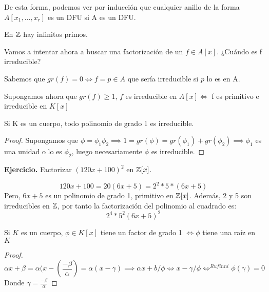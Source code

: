 \begin{nota}
	De esta forma, podemos ver por inducción que cualquier anillo de la forma $A[x_1,...,x_r] $ es un DFU si A es un DFU.
\end{nota}
\begin{nota}[2]
	En $\mathbb{Z}$ hay infinitos primos.

\end{nota}

Vamos a intentar ahora a buscar una factorización de un $f \in A[x]$. ¿Cuándo es f irreducible?

 Sabemos que $gr(f) = 0 \iff f = p \in A$ que sería irreducible si $p$ lo es en A.

 Supongamos ahora que $gr(f) \geq 1$, $f$ es irreducible en $A[x] \iff$ f es primitivo e irreducible en $K[x]$

\begin{nota}
	Si K es un cuerpo, todo polinomio de grado 1 es irreducible.
	\begin{proof}
	Supongamos que $\phi = \phi_1 \phi_2 \implies 1 = gr(\phi) =  gr(\phi_1)+gr(\phi_2) \implies \phi_1$ es una unidad o lo es $\phi_2$, luego necesariamente $\phi$ es irreducible.
\end{proof}
\end{nota}


\textbf{Ejercicio.} Factorizar $(120x+100)^2$ en $\mathbb{Z}[x]$.

\[
120x+100 = 20(6x+5) = 2^2*5*(6x+5)
\]
Pero, $6x+5$ es un polinomio de grado 1, primitivo en $\mathbb{Z}[x]$. Además, 2 y 5 son irreducibles en $\mathbb{Z}$, por tanto la factorización del polinomio al cuadrado es:
\[
2^4*5^2(6x+5)^2
\]

\begin{nota}
	Si $K$ es un cuerpo, $\phi \in K[x]$ tiene un factor de grado 1 $\iff \phi$ tiene una raíz en $K$
	\begin{proof}
	$$\alpha x + \beta = \alpha(x-(\frac{-\beta}{\alpha}) = \alpha(x - \gamma) \implies \alpha x+b/\phi \iff x-\gamma / \phi \iff^{Rufinni} \phi(\gamma) = 0$$
	Donde $\gamma = \frac{-\beta}{\alpha}$
\end{proof}
\end{nota}

